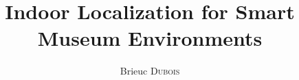 \documentclass{cover/EPL-master-thesis-covers-EN}
\title{Indoor Localization for Smart Museum Environments}
\author{Brieuc \textsc{Dubois}}
\begin{document}
  \maketitle

  
  
  
  
  
  
  
  
  
  

  
  

  \backcoverpage
\end{document}
